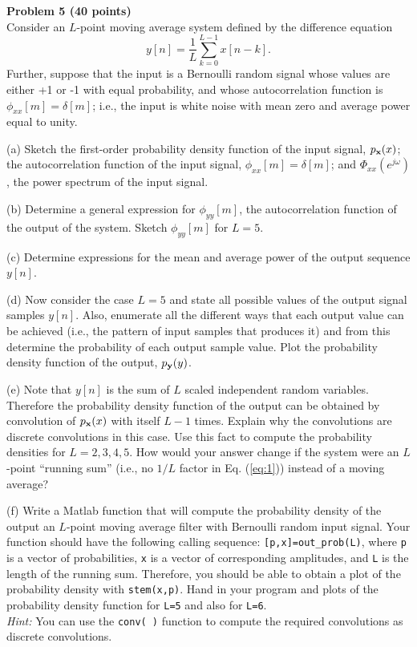 \documentclass[12pt]{report}
\begin{document}
\newpage
\noindent
{\bf Problem 5 (40 points)} \\
Consider an $L$-point moving average system defined by the difference equation
\begin{equation}
\label{eq:1}
y[n]=\frac{1}{L} \sum_{k=0}^{L-1} x[n-k].
\end{equation}
Further, suppose that the input is a Bernoulli random signal whose
values are either +1 or -1 with equal probability, and whose
autocorrelation function is $\phi_{xx}[m]=\delta[m]$; i.e., the
input is white noise with mean zero and average power equal to
unity.
\begin{description}
\item{(a)}
Sketch the first-order probability density function of the
input signal, $p_{\bf x}(x)$; the autocorrelation function of
the input signal, $\phi_{xx}[m]=\delta[m]$; and
$\Phi_{xx}(e^{j\omega})$, the power spectrum of the input signal.
\item{(b)}
 Determine a general expression for $\phi_{yy}[m]$, the autocorrelation
function of the output of the system. Sketch $\phi_{yy}[m]$ for $L=5$.
\item{(c)} Determine expressions for the mean and average power of
the output sequence $y[n]$.
\item{(d)} Now consider the case $L=5$ and state all possible values of the output signal samples $y[n]$. Also, enumerate all the different
    ways that each output value can be achieved (i.e., the pattern of input
    samples that produces it) and from this determine the probability of
    each output sample value.  Plot the probability density function of the
    output, $p_{\bf y}(y)$.

\item{(e)} Note that $y[n]$ is the sum of $L$ scaled independent random variables.
    Therefore the probability density function of the output can be
    obtained by convolution of $p_{\bf x}(x)$ with itself $L-1$
    times. Explain why the convolutions are discrete convolutions in this case. Use this fact to compute the probability densities for $L=2, 3,
    4, 5$.  How would your answer change if the system were an $L$-point
    ``running sum'' (i.e., no $1/L$ factor in Eq. (\ref{eq:1})) instead of
    a moving average?

\item{(f)} Write a Matlab function that will compute the probability density
    of the output an $L$-point moving average filter with Bernoulli random input signal. Your function should have the
    following calling sequence: \verb+[p,x]=out_prob(L)+, where \verb+p+ is
    a vector of probabilities, \verb+x+ is a vector of corresponding
    amplitudes, and \verb+L+ is the length of the running sum. Therefore,
    you should be able to obtain a plot of the probability density with
    \verb+stem(x,p)+.  Hand in your program and plots of the probability
    density function for \verb+L=5+ and also for \verb+L=6+. \\
    \textit{Hint:} You can use the \verb+conv( )+ function to compute the required convolutions as discrete convolutions.


\end{description}
\end{document}
